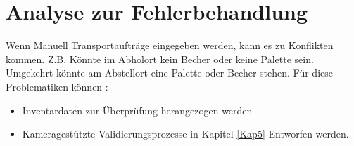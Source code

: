 \chapter{Analyse zur Fehlerbehandlung}


Wenn Manuell Transportaufträge eingegeben werden, kann es zu Konflikten kommen.
Z.B. Könnte im Abholort kein Becher oder keine Palette sein.
Umgekehrt könnte am Abstellort eine Palette oder Becher stehen.
Für diese Problematiken können :
\begin{itemize}
    \item Inventardaten zur Überprüfung herangezogen werden
    \item Kameragestützte Validierungsprozesse in Kapitel \ref{Kap5} Entworfen werden.
\end{itemize}